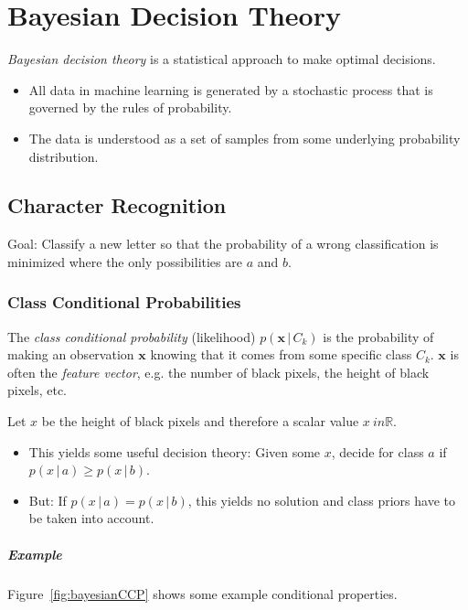 \documentclass[a4paper, 11pt, accentcolor = tud3b]{tudreport}
\newcommand{\given}{\ensuremath{\,\vert\,}}
\newcommand{\R}{\ensuremath{\mathbb{R}}}
\renewcommand{\vec}[1]{\mathbf{#1}}
\begin{document}
	\chapter{Bayesian Decision Theory}
		\label{c:bayesianDecisionTheory}

		\emph{Bayesian decision theory} is a statistical approach to make optimal decisions.

		\begin{itemize}
			\item All data in machine learning is generated by a stochastic process that is governed by the rules of probability.
			\item The data is understood as a set of samples from some underlying probability distribution.
		\end{itemize}

		\section{Character Recognition}
			Goal: Classify a new letter so that the probability of a wrong classification is minimized where the only possibilities are \(a\) and \(b\).

			\subsection{Class Conditional Probabilities}
				The \emph{class conditional probability} (likelihood) \( p(\vec{x} \given C_k) \) is the probability of making an observation \(\vec{x}\) knowing that it comes from some specific class \(C_k\). \(\vec{x}\) is often the \emph{feature vector}, e.g. the number of black pixels, the height of black pixels, etc.

				Let \(x\) be the height of black pixels and therefore a scalar value \(x\ in \R\).

				\begin{itemize}
					\item This yields some useful decision theory: Given some \(x\), decide for class \(a\) if \( p(x \given a) \geq p(x \given b) \).
					\item But: If \( p(x \given a) = p(x \given b) \), this yields no solution and class priors have to be taken into account.
				\end{itemize}

				\paragraph{Example}
					Figure~\ref{fig:bayesianCCP} shows some example conditional properties.
\end{document}
